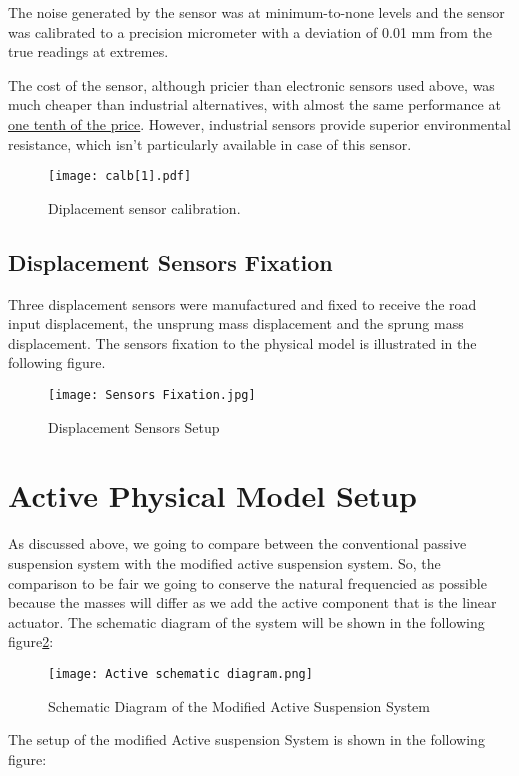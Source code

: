 The noise generated by the sensor was at minimum-to-none levels and the sensor was calibrated to a precision micrometer with a deviation of 0.01 mm from the true readings at extremes.

The cost of the sensor, although pricier than electronic sensors used above, was much cheaper than industrial alternatives, with almost the same performance at \underline{one tenth of the price}. However, industrial sensors provide superior environmental resistance, which isn't particularly available in case of this sensor.
\begin{figure}[H]
    \centering
    \texttt{[image: calb[1].pdf]}
    \caption{Diplacement sensor calibration. \cite{malaric2011instrumentation}}
\end{figure}
\newpage
\subsection{Displacement Sensors Fixation}
Three displacement sensors were manufactured and fixed to receive the road input displacement, the unsprung mass displacement and the sprung mass displacement.
The sensors fixation to the physical model is illustrated in the following figure.
\begin{figure}[H]
    \centering
    \texttt{[image: Sensors Fixation.jpg]}
    \caption{Displacement Sensors Setup}
    \label{fig:Sensors Fixation}
    
\end{figure}

\newpage
\section{Active Physical Model Setup}
As discussed above, we going to compare between the conventional passive suspension system with the modified active suspension system. So, the comparison to be fair we going to conserve the natural frequencied as possible because the masses will differ as we add the active component that is the linear actuator. The schematic diagram of the system will be shown in the following figure\ref{fig:Active schematic diagram}:
\begin{figure}[H]
    \centering
    \texttt{[image: Active schematic diagram.png]}
    \caption{Schematic Diagram of the Modified Active Suspension System \cite{wong2001theory}}
    \label{fig:Active schematic diagram}
    
\end{figure}
The setup of the modified Active suspension System is shown in the following figure:

